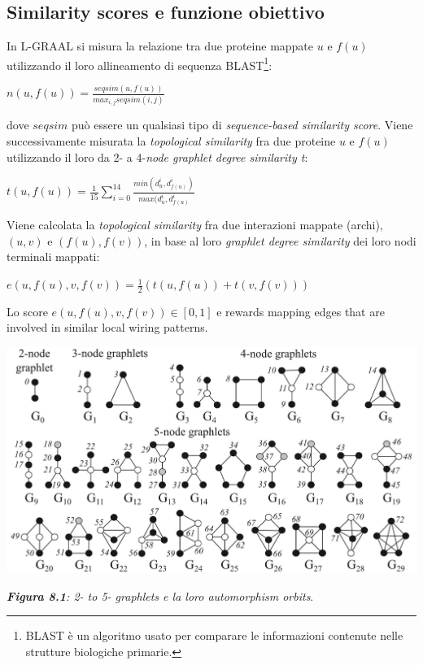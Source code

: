 \documentclass[11pt]{article}
\begin{document}
\subsection{Similarity scores e funzione obiettivo}
In L-GRAAL si misura la relazione tra due proteine mappate $u$ e $f(u)$ utilizzando il loro allineamento di sequenza BLAST\footnote{BLAST è un algoritmo usato per comparare le informazioni contenute nelle strutture biologiche primarie.}:
\begin{center}
$n(u,f(u)) = \displaystyle{\frac{seqsim(u,f(u))}{max_{i,j}seqsim(i,j)}}$
\end{center}
dove $seqsim$ può essere un qualsiasi tipo di \textit{sequence-based similarity score}. Viene successivamente misurata la \textit{topological similarity} fra due proteine $u$ e $f(u)$ utilizzando il loro da 2- a 4-\textit{node graphlet degree similarity t}:
\begin{center}
$t(u,f(u)) = \frac{1}{15}\displaystyle{\sum \limits_{i=0}^{14}\frac{min(d_u^i,d_{f(u)}^i)}{max(d_u^i,d_{f(u)}^i}}$
\end{center}
Viene calcolata la \textit{topological similarity} fra due interazioni mappate (archi), $(u,v)$ e $(f(u),f(v))$, in base al loro \textit{graphlet degree similarity} dei loro nodi terminali mappati:

\begin{center}
$e(u,f(u),v,f(v)) = \displaystyle{\frac{1}{2}(t(u,f(u))+t(v,f(v)))}$
\end{center}
Lo score $e(u,f(u),v,f(v)) \in [0,1]$ e rewards mapping edges that are involved in similar local wiring patterns.

\begin{center}
\includegraphics[scale=0.36]{graal1}

\begin{small}\textit{\textbf{Figura 8.1}: 2- to 5- graphlets e la loro automorphism orbits}.\end{small}
\end{center}
\end{document}
